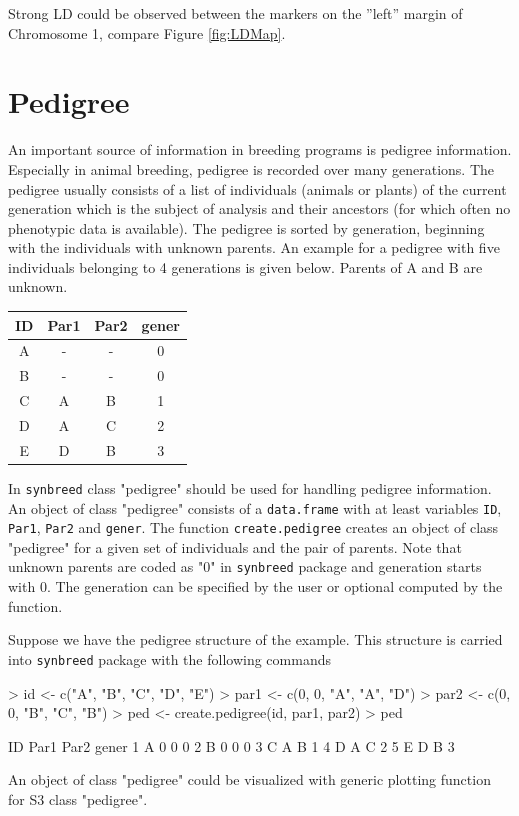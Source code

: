 \documentclass[a4paper,11pt]{article}
\begin{document}
Strong LD could be observed between the markers on the ''left'' margin of Chromosome 1, compare Figure \ref{fig:LDMap}.



\section{Pedigree}\label{sec:Pedigree}     
                               
An important source of information in breeding programs is pedigree information. Especially in animal breeding, pedigree is recorded over many generations. The pedigree usually consists 
of a list of individuals (animals or plants) of the current generation which is the subject of analysis and their ancestors (for which often no phenotypic data is available). The pedigree is sorted by generation, beginning with the individuals with unknown parents. An example for a pedigree with five individuals belonging to 4 generations is given below. Parents of A and B are unknown.

\begin{table}[!ht]
\centering
\begin{tabular}{cccc}
\hline
ID & Par1 & Par2 & gener \\
\hline
A & - & - & 0 \\
B & - & - & 0 \\
C & A & B & 1 \\
D & A & C & 2 \\
E & D & B & 3 \\
\hline
\end{tabular}
\end{table}

 In \texttt{synbreed} class "pedigree" should be used for handling pedigree information. An object of class "pedigree" consists of a \texttt{data.frame} with at least variables \texttt{ID}, \texttt{Par1}, \texttt{Par2} and \texttt{gener}.
The function \texttt{create.pedigree} creates an object of class  "pedigree" for a given set of individuals and the pair of parents. Note that unknown parents are coded as "0" in \texttt{synbreed} package and generation starts with 0. The generation can be specified by the user or optional computed by the function.

Suppose we have the pedigree structure of the example. This structure is carried into \texttt{synbreed} package with the following commands
\begin{Schunk}
\begin{Sinput}
> id <- c("A", "B", "C", "D", "E")
> par1 <- c(0, 0, "A", "A", "D")
> par2 <- c(0, 0, "B", "C", "B")
> ped <- create.pedigree(id, par1, par2)
> ped
\end{Sinput}
\begin{Soutput}
  ID Par1 Par2 gener
1  A    0    0     0
2  B    0    0     0
3  C    A    B     1
4  D    A    C     2
5  E    D    B     3
\end{Soutput}
\end{Schunk}
An object of class "pedigree" could be visualized with generic plotting function for S3 class "pedigree".
 
\end{document}
